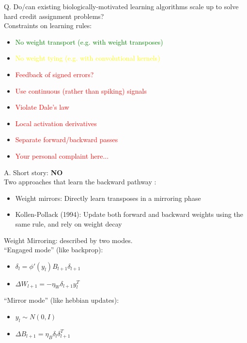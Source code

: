 \documentclass[12pt]{article}
\begin{document}
Q. Do/can existing biologically-motivated learning algorithms scale up to solve hard credit assignment problems? \\

Constraints on learning rules:
\begin{itemize}
    \item \textcolor{green}{No weight transport (e.g. with weight transposes)}
    \item \textcolor{yellow}{No weight tying (e.g. with convolutional kernels)}
    \item \textcolor{red}{Feedback of signed errors?}
    \item \textcolor{red}{Use continuous (rather than spiking) signals}
    \item \textcolor{red}{Violate Dale's law}
    \item \textcolor{red}{Local activation derivatives}
    \item \textcolor{red}{Separate forward/backward passes}
    \item \textcolor{red}{Your personal complaint here...}
\end{itemize}

A. Short story: \textbf{NO} \cite{Bartunov18} \\

Two approaches that learn the backward pathway \cite{Akrout19}: 
\begin{itemize}
    \item Weight mirrors: Directly learn transposes in a mirroring phase
    \item Kollen-Pollack (1994): Update both forward and backward weights using the same rule, and rely on weight decay
\end{itemize}

Weight Mirroring: described by two modes. \\

``Engaged mode'' (like backprop):
\begin{itemize}
    \item $\delta_l = \phi'(y_l)B_{l+1}\delta_{l+1}$
    \item $\Delta W_{l+1} = -\eta_W \delta_{l+1}y_l^T$
\end{itemize}
``Mirror mode'' (like hebbian updates):
\begin{itemize}
    \item $y_l \sim N(0,I)$
    \item $\Delta B_{l+1} = \eta_B \delta_l \delta_{l+1}^T$
\end{itemize}
\end{document}
